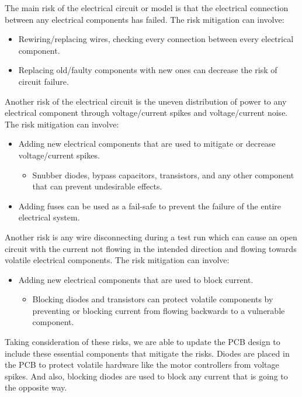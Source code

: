 \documentclass[a4paper, 10pt]{article}
\begin{document}
The main risk of the electrical circuit or model is that the electrical connection between any electrical components has failed. The risk mitigation can involve:

\begin{itemize}
\item
Rewiring/replacing wires, checking every connection between every electrical component.

\item
Replacing old/faulty components with new ones can decrease the risk of circuit failure.
\end{itemize}

Another risk of the electrical circuit is the uneven distribution of power to any electrical component through voltage/current spikes and voltage/current noise. The risk mitigation can involve:

\begin{itemize}
\item
Adding new electrical components that are used to mitigate or decrease voltage/current spikes.

	\begin{itemize}
		\item
		Snubber diodes, bypass capacitors, transistors, and any other component that can prevent undesirable effects. 
	\end{itemize}
	
\item
Adding fuses can be used as a fail-safe to prevent the failure of the entire electrical system.
\end{itemize}


Another risk is any wire disconnecting during a test run which can cause an open circuit with the current not flowing in the intended direction and flowing towards volatile electrical components. The risk mitigation can involve:

\begin{itemize}
\item
Adding new electrical components that are used to block current.

	\begin{itemize}
		\item
		Blocking diodes and transistors can protect volatile components by preventing or blocking current from flowing backwards to a vulnerable component. 
	\end{itemize}
\end{itemize}

Taking consideration of these risks, we are able to update the PCB design to include these essential components that mitigate the risks. Diodes are placed in the PCB to protect volatile hardware like the motor controllers from voltage spikes. And also, blocking diodes are used to block any current that is going to the opposite way. 
\end{document}
